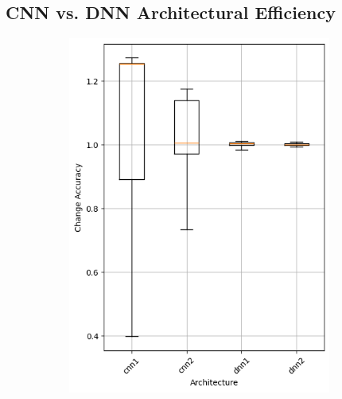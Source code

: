\subsection{CNN vs. DNN Architectural Efficiency}\label{subsec:cnn-vs.-dnn-architectural-efficiency}
\begin{figure}
    \begin{subfigure}{0.5\textwidth}
        \centering
        \includegraphics[width=0.95\textwidth]{plots/Architecture_NotTrained_accuracy.png}
    \end{subfigure}
    \begin{subfigure}{0.5\textwidth}
        \centering

\end{subfigure}
\end{figure}
